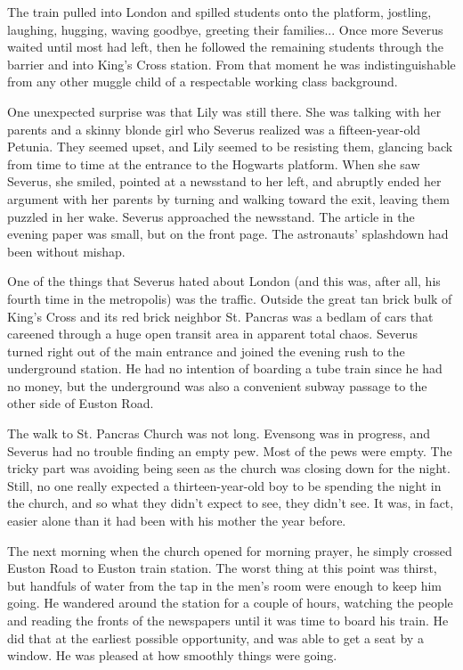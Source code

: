 \documentclass[a4paper,11pt]{article}
\begin{document}
The train pulled into London and spilled students onto the platform, jostling, laughing, hugging, waving goodbye, greeting their families... Once more Severus waited until most had left, then he followed the remaining students through the barrier and into King's Cross station. From that moment he was indistinguishable from any other muggle child of a respectable working class background.

One unexpected surprise was that Lily was still there. She was talking with her parents and a skinny blonde girl who Severus realized was a fifteen-year-old Petunia. They seemed upset, and Lily seemed to be resisting them, glancing back from time to time at the entrance to the Hogwarts platform. When she saw Severus, she smiled, pointed at a newsstand to her left, and abruptly ended her argument with her parents by turning and walking toward the exit, leaving them puzzled in her wake. Severus approached the newsstand. The article in the evening paper was small, but on the front page. The astronauts' splashdown had been without mishap.

One of the things that Severus hated about London (and this was, after all, his fourth time in the metropolis) was the traffic. Outside the great tan brick bulk of King's Cross and its red brick neighbor St. Pancras was a bedlam of cars that careened through a huge open transit area in apparent total chaos. Severus turned right out of the main entrance and joined the evening rush to the underground station. He had no intention of boarding a tube train since he had no money, but the underground was also a convenient subway passage to the other side of Euston Road.

The walk to St. Pancras Church was not long. Evensong was in progress, and Severus had no trouble finding an empty pew. Most of the pews were empty. The tricky part was avoiding being seen as the church was closing down for the night. Still, no one really expected a thirteen-year-old boy to be spending the night in the church, and so what they didn't expect to see, they didn't see. It was, in fact, easier alone than it had been with his mother the year before.

The next morning when the church opened for morning prayer, he simply crossed Euston Road to Euston train station. The worst thing at this point was thirst, but handfuls of water from the tap in the men's room were enough to keep him going. He wandered around the station for a couple of hours, watching the people and reading the fronts of the newspapers until it was time to board his train. He did that at the earliest possible opportunity, and was able to get a seat by a window. He was pleased at how smoothly things were going.
\end{document}
